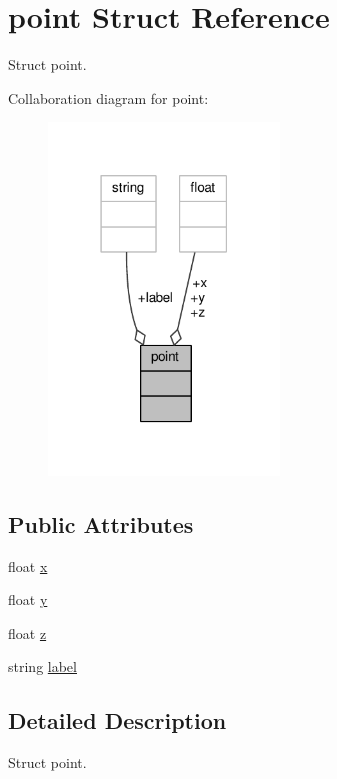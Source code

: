 \hypertarget{structpoint}{}\section{point Struct Reference}
\label{structpoint}


Struct point.  




Collaboration diagram for point\+:
\nopagebreak
\begin{figure}[H]
\begin{center}
\leavevmode
\includegraphics[width=174pt]{structpoint__coll__graph}
\end{center}
\end{figure}
\subsection*{Public Attributes}
\begin{DoxyCompactItemize}
\item 
float \hyperlink{structpoint_a8293fd2de3ce739deb6d53691fd21fcf}{x}
\item 
float \hyperlink{structpoint_a616ad85a2096d1566f5971666bbc3b3f}{y}
\item 
float \hyperlink{structpoint_a3c15cf62431e51a4d9432ca40b3b04f5}{z}
\item 
string \hyperlink{structpoint_aac98b52176e98d5ae6ab04ff1351fb14}{label}
\end{DoxyCompactItemize}


\subsection{Detailed Description}
Struct point. 

